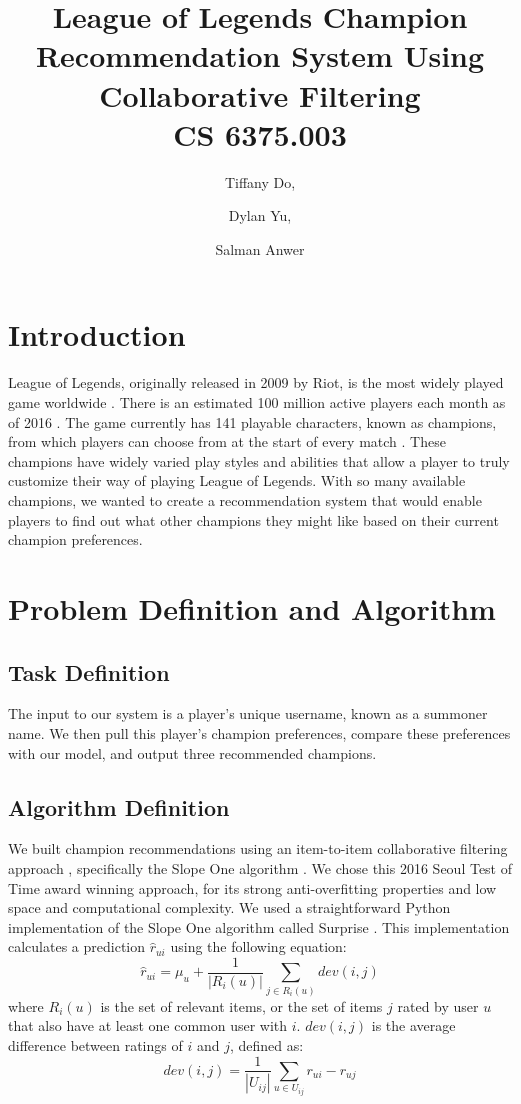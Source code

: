 \documentclass [11pt]{IEEEtran}
\title{League of Legends Champion Recommendation System Using Collaborative Filtering\\ {\large CS 6375.003}}
\author{Tiffany Do, \and Dylan Yu, \and Salman Anwer}
\begin{document}
\maketitle
\section{Introduction}
League of Legends, originally released in 2009 by Riot, is the most widely played game worldwide \cite{gaudiosi_2013}. There is an estimated 100 million active players each month as of 2016 \cite{volk_2016}. The game currently has 141 playable characters, known as champions, from which players can choose from at the start of every match \cite{champlist}. These champions have widely varied play styles and abilities that allow a player to truly customize their way of playing League of Legends. With so many available champions, we wanted to create a recommendation system that would enable players to find out what other champions they might like based on their current champion preferences.

\section{Problem Definition and Algorithm}
\subsection{Task Definition}
The input to our system is a player’s unique username, known as a summoner name. We then pull this player’s champion preferences, compare these preferences with our model, and output three recommended champions.
\subsection{Algorithm Definition}
We built champion recommendations using an item-to-item collaborative filtering approach \cite{Sarwar:2001}, specifically the Slope One algorithm \cite{Lemire_2005}. We chose this 2016 Seoul Test of Time award winning \cite{um} approach, for its strong anti-overfitting properties and low space and computational complexity. We used a straightforward Python implementation of the Slope One algorithm called Surprise \cite{Surprise}. \midskip
This implementation calculates a prediction $\hat{r}_{ui}$ using the following equation:
$$
    \hat{r}_{ui} = \mu_u + \frac{1}{|{R_i(u)}|}\sum_{j\in R_i(u)} dev(i,j)
$$
where $R_i(u)$ is the set of relevant items, or the set of items $j$ rated by user $u$ that also have at least one common user with $i$. $dev(i,j)$ is the average difference between ratings of $i$ and $j$, defined as:
$$
    dev(i,j) = \frac{1}{|{U_{ij}}|}\sum_{u\in U_{ij}} r_{ui} - r_{uj}
$$
\end{document}
